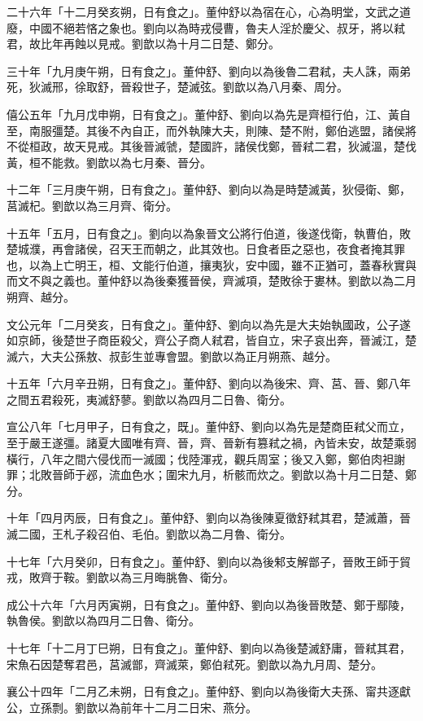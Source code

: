 \begin{pinyinscope}
二十六年「十二月癸亥朔，日有食之」。董仲舒以為宿在心，心為明堂，文武之道廢，中國不絕若悋之象也。劉向以為時戎侵曹，魯夫人淫於慶父、叔牙，將以弒君，故比年再蝕以見戒。劉歆以為十月二日楚、鄭分。

三十年「九月庚午朔，日有食之」。董仲舒、劉向以為後魯二君弒，夫人誅，兩弟死，狄滅邢，徐取舒，晉殺世子，楚滅弦。劉歆以為八月秦、周分。

僖公五年「九月戊申朔，日有食之」。董仲舒、劉向以為先是齊桓行伯，江、黃自至，南服彊楚。其後不內自正，而外執陳大夫，則陳、楚不附，鄭伯逃盟，諸侯將不從桓政，故天見戒。其後晉滅虢，楚國許，諸侯伐鄭，晉弒二君，狄滅溫，楚伐黃，桓不能救。劉歆以為七月秦、晉分。

十二年「三月庚午朔，日有食之」。董仲舒、劉向以為是時楚滅黃，狄侵衛、鄭，莒滅杞。劉歆以為三月齊、衛分。

十五年「五月，日有食之」。劉向以為象晉文公將行伯道，後遂伐衛，執曹伯，敗楚城濮，再會諸侯，召天王而朝之，此其效也。日食者臣之惡也，夜食者掩其罪也，以為上亡明王，桓、文能行伯道，攘夷狄，安中國，雖不正猶可，蓋春秋實與而文不與之義也。董仲舒以為後秦獲晉侯，齊滅項，楚敗徐于婁林。劉歆以為二月朔齊、越分。

文公元年「二月癸亥，日有食之」。董仲舒、劉向以為先是大夫始執國政，公子遂如京師，後楚世子商臣殺父，齊公子商人弒君，皆自立，宋子哀出奔，晉滅江，楚滅六，大夫公孫敖、叔彭生並專會盟。劉歆以為正月朔燕、越分。

十五年「六月辛丑朔，日有食之」。董仲舒、劉向以為後宋、齊、莒、晉、鄭八年之間五君殺死，夷滅舒蓼。劉歆以為四月二日魯、衛分。

宣公八年「七月甲子，日有食之，既」。董仲舒、劉向以為先是楚商臣弒父而立，至于嚴王遂彊。諸夏大國唯有齊、晉，齊、晉新有篡弒之禍，內皆未安，故楚乘弱橫行，八年之間六侵伐而一滅國；伐陸渾戎，觀兵周室；後又入鄭，鄭伯肉袒謝罪；北敗晉師于邲，流血色水；圍宋九月，析骸而炊之。劉歆以為十月二日楚、鄭分。

十年「四月丙辰，日有食之」。董仲舒、劉向以為後陳夏徵舒弒其君，楚滅蕭，晉滅二國，王札子殺召伯、毛伯。劉歆以為二月魯、衛分。

十七年「六月癸卯，日有食之」。董仲舒、劉向以為後邾支解鄫子，晉敗王師于貿戎，敗齊于鞍。劉歆以為三月晦朓魯、衛分。

成公十六年「六月丙寅朔，日有食之」。董仲舒、劉向以為後晉敗楚、鄭于鄢陵，執魯侯。劉歆以為四月二日魯、衛分。

十七年「十二月丁巳朔，日有食之」。董仲舒、劉向以為後楚滅舒庸，晉弒其君，宋魚石因楚奪君邑，莒滅鄫，齊滅萊，鄭伯弒死。劉歆以為九月周、楚分。

襄公十四年「二月乙未朔，日有食之」。董仲舒、劉向以為後衛大夫孫、甯共逐獻公，立孫剽。劉歆以為前年十二月二日宋、燕分。


\end{pinyinscope}
